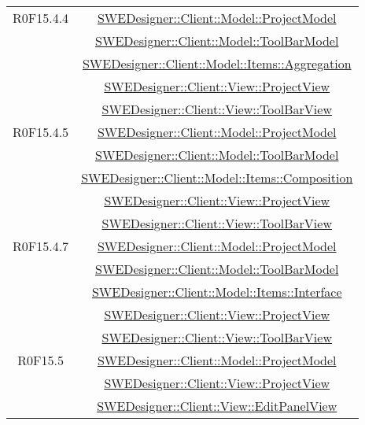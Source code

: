 \documentclass[../DefinizioneDiProdotto.tex]{subfiles}
\begin{document}
\begin{longtable}{|c|c|}
				R0F15.4.4
				& \hyperlink{SWEDesigner::Client::Model::ProjectModel}{SWEDesigner::Client::Model::ProjectModel}\\
				& \hyperlink{SWEDesigner::Client::Model::ToolBarModel}{SWEDesigner::Client::Model::ToolBarModel}\\
				& \hyperlink{SWEDesigner::Client::Model::Items::Aggregation}{SWEDesigner::Client::Model::Items::Aggregation}\\
				& \hyperlink{SWEDesigner::Client::View::ProjectView}{SWEDesigner::Client::View::ProjectView}\\
				& \hyperlink{SWEDesigner::Client::View::ToolBarView}{SWEDesigner::Client::View::ToolBarView}\\
				\hline

				R0F15.4.5
				& \hyperlink{SWEDesigner::Client::Model::ProjectModel}{SWEDesigner::Client::Model::ProjectModel}\\
				& \hyperlink{SWEDesigner::Client::Model::ToolBarModel}{SWEDesigner::Client::Model::ToolBarModel}\\
				& \hyperlink{SWEDesigner::Client::Model::Items::Composition}{SWEDesigner::Client::Model::Items::Composition}\\
				& \hyperlink{SWEDesigner::Client::View::ProjectView}{SWEDesigner::Client::View::ProjectView}\\
				& \hyperlink{SWEDesigner::Client::View::ToolBarView}{SWEDesigner::Client::View::ToolBarView}\\
				\hline

				R0F15.4.7
				& \hyperlink{SWEDesigner::Client::Model::ProjectModel}{SWEDesigner::Client::Model::ProjectModel}\\
				& \hyperlink{SWEDesigner::Client::Model::ToolBarModel}{SWEDesigner::Client::Model::ToolBarModel}\\
				& \hyperlink{SWEDesigner::Client::Model::Items::Interface}{SWEDesigner::Client::Model::Items::Interface}\\
				& \hyperlink{SWEDesigner::Client::View::ProjectView}{SWEDesigner::Client::View::ProjectView}\\
				& \hyperlink{SWEDesigner::Client::View::ToolBarView}{SWEDesigner::Client::View::ToolBarView}\\
				\hline

				R0F15.5
				& \hyperlink{SWEDesigner::Client::Model::ProjectModel}{SWEDesigner::Client::Model::ProjectModel}\\
				& \hyperlink{SWEDesigner::Client::View::ProjectView}{SWEDesigner::Client::View::ProjectView}\\
				& \hyperlink{SWEDesigner::Client::View::EditPanelView}{SWEDesigner::Client::View::EditPanelView}\\
				\hline


\end{longtable}
\end{document}

